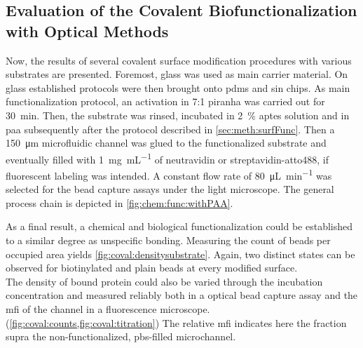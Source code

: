 \subsection{Evaluation of the Covalent Biofunctionalization with Optical Methods}
Now, the results of several covalent surface modification procedures with various substrates are presented. Foremost, glass was used as main carrier material. On glass established protocols were then brought onto \gls{pdms} and \gls{sin} chips. As main functionalization protocol, an activation in 7:1 \gls{piranha} was carried out for \SI{30}{\minute}. Then, the substrate was rinsed, incubated in \SI{2}{\percent} \gls{aptes} solution and in \gls{paa} subsequently after the protocol described in \cref{sec:meth:surfFunc}. Then a \SI{150}{\micro\meter} microfluidic channel was glued to the functionalized substrate and eventually filled with \SI{1}{\milli\gram\per\milli\liter} of neutravidin or streptavidin-atto488, if fluorescent labeling was intended. A constant flow rate of \SI{80}{\micro\liter\per\minute} was selected for the bead capture assays under the light microscope. The general process chain is depicted in \cref{fig:chem:func:withPAA}.


As a final result, a chemical and biological functionalization could be established to a similar degree as unspecific bonding. Measuring the count of beads per occupied area yields \cref{fig:coval:densitysubstrate}. Again, two distinct states can be observed for biotinylated and plain beads at every modified surface.\\
The density of bound protein could also be varied through the incubation concentration and measured reliably both in a optical bead capture assay and the \gls{mfi} of the channel in a fluorescence microscope.(\cref{fig:coval:counts,fig:coval:titration}) The relative \gls{mfi} indicates here the fraction supra the non-functionalized, \gls{pbs}-filled microchannel. 

